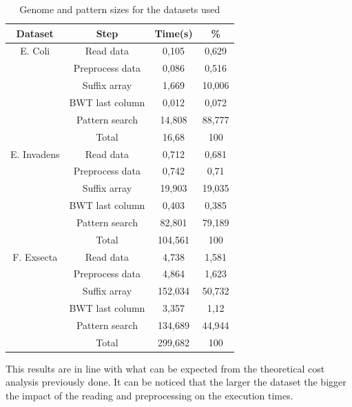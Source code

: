 \documentclass[final,5p,times,twocolumn,authoryear]{elsarticle}
\begin{document}
\begin{table}[H]
\begin{center}
\begin{tabular}{|| c c c c ||}
\hline
Dataset & Step & Time(s) & \% \\
\hline
 E. Coli & Read data & 0,105 & 0,629 \\
    & Preprocess data & 0,086 & 0,516 \\
    & Suffix array & 1,669 & 10,006 \\
    & BWT last column & 0,012 & 0,072 \\
    & Pattern search & 14,808 & 88,777 \\
    & Total & 16,68 & 100 \\
\hline
E. Invadens & Read data & 0,712 & 0,681 \\
    & Preprocess data & 0,742 & 0,71 \\
    & Suffix array & 19,903 & 19,035 \\
    & BWT last column & 0,403 & 0,385 \\
    & Pattern search & 82,801 & 79,189 \\
    & Total & 104,561 & 100 \\
\hline
F. Exsecta & Read data & 4,738 & 1,581 \\
    & Preprocess data & 4,864 & 1,623 \\
    & Suffix array & 152,034 & 50,732 \\
    & BWT last column & 3,357 & 1,12 \\
    & Pattern search & 134,689 & 44,944 \\
    & Total & 299,682 & 100 \\
\hline
\end{tabular}
\end{center}
\caption{Genome and pattern sizes for the datasets used}
\vspace{-2mm}%
\label{table:times_table}
\end{table}
This results are in line with what can be expected from the theoretical cost analysis previously done. It can be noticed that the larger the dataset the bigger the impact of the reading and preprocessing on the execution times.
\end{document}
